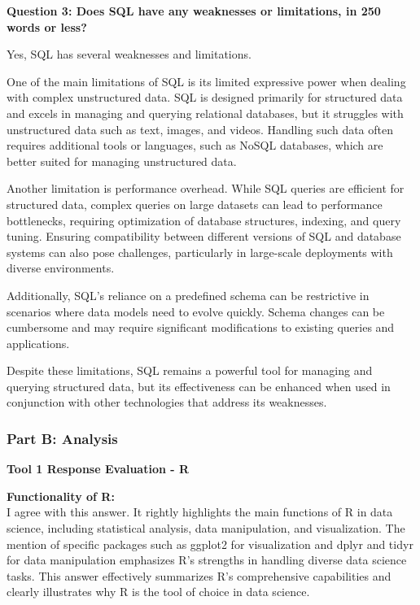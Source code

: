 \documentclass[a4paper, 11pt]{report}
\begin{document}
\vspace{\baselineskip}

\textbf{Question 3: Does SQL have any weaknesses or limitations, in 250 words or less?}

Yes, SQL has several weaknesses and limitations.

One of the main limitations of SQL is its limited expressive power when dealing with complex unstructured data. SQL is designed primarily for structured data and excels in managing and querying relational databases, but it struggles with unstructured data such as text, images, and videos. Handling such data often requires additional tools or languages, such as NoSQL databases, which are better suited for managing unstructured data.

Another limitation is performance overhead. While SQL queries are efficient for structured data, complex queries on large datasets can lead to performance bottlenecks, requiring optimization of database structures, indexing, and query tuning. Ensuring compatibility between different versions of SQL and database systems can also pose challenges, particularly in large-scale deployments with diverse environments.

Additionally, SQL’s reliance on a predefined schema can be restrictive in scenarios where data models need to evolve quickly. Schema changes can be cumbersome and may require significant modifications to existing queries and applications.

Despite these limitations, SQL remains a powerful tool for managing and querying structured data, but its effectiveness can be enhanced when used in conjunction with other technologies that address its weaknesses.

\subsubsection{Part B: Analysis}

\textbf{\large{Tool 1 Response Evaluation - R}}

\textbf{Functionality of R:} \\
\noindent I agree with this answer. It rightly highlights the main functions of R in data science, including statistical analysis, data manipulation, and visualization. The mention of specific packages such as ggplot2 for visualization and dplyr and tidyr for data manipulation emphasizes R's strengths in handling diverse data science tasks. This answer effectively summarizes R's comprehensive capabilities and clearly illustrates why R is the tool of choice in data science.
\end{document}
